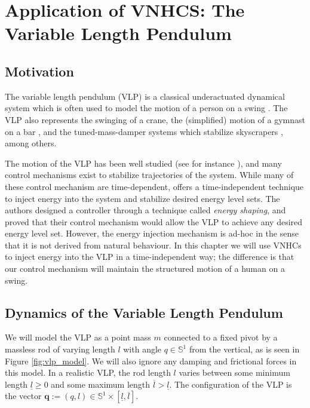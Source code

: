 
\chapter{Application of VNHCS: The Variable Length Pendulum}\label{sec:vlp}
\section{Motivation}
The variable length pendulum (VLP) is a classical underactuated dynamical system
which is often used to model the motion of a person on a swing
\cite{pumping_swing_standing_squatting,how_to_pump_a_swing}.
The VLP also represents the swinging of a crane, the (simplified) motion of a
gymnast on a bar \cite{pendulum_length_giant_gymnastics}, and the
tuned-mass-damper systems which stabilize skyscrapers
\cite{vlp_tuned_mass_damper}, among others.

The motion of the VLP has been well studied (see for instance
\cite{dynamics_periodic_vlp}), and many control mechanisms exist
to stabilize trajectories of the system. While many of these control mechanism
are time-dependent, \cite{vlp_energy_shaping}
offers a time-independent technique to inject energy into the system and
stabilize desired energy level sets. The authors designed a controller through a
technique called \textit{energy shaping}, and proved that their control
mechanism would allow the VLP to achieve any desired energy level set.
However, the energy injection mechanism is
ad-hoc in the sense that it is not derived from natural behaviour. In
this chapter we will use VNHCs to inject energy into the VLP in a
time-independent way;
the difference is that our control mechanism will maintain the structured motion
of a human on a swing.

\section{Dynamics of the Variable Length Pendulum}
We will model the VLP as a point mass \(m\)
connected to a fixed pivot by a massless rod of varying length \(l\) with angle 
\(q \in \mathbb{S}^1\) from the vertical, as is seen in Figure
\ref{fig:vlp_model}. 
We will also ignore any damping and frictional forces in this model.
In a realistic VLP, the rod length \(l\) varies between some minimum
length \(\underline{l} \geq 0\) and some maximum length 
\(\overline{l} > \underline{l}\). The configuration of the VLP is the vector
\(\mathbf{q} := (q,l) \in \mathbb{S}^1 \times [\underline{l},\overline{l}]\).

